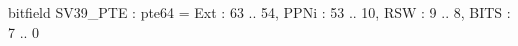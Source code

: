 bitfield SV39_PTE : pte64 = {
  Ext   : 63 .. 54,
  PPNi  : 53 .. 10,
  RSW   : 9  .. 8,
  BITS  : 7  .. 0
}
